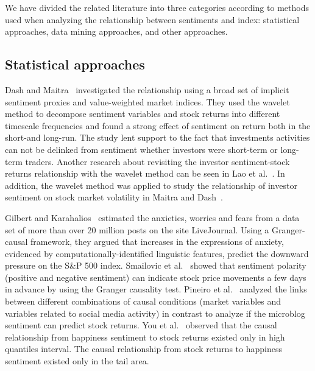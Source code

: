 \documentclass[review,3p,times,12pt,number]{elsarticle}
\begin{document}
We have divided the related literature into three categories according to methods used when analyzing the relationship between sentiments and index: statistical approaches, data mining approaches, and other approaches.
\subsection{Statistical approaches}

Dash and Maitra~\cite{Dash2017Does} investigated the relationship using a broad set of implicit sentiment proxies and value-weighted market indices. They used the wavelet method to decompose sentiment variables and stock returns into different timescale frequencies and found a strong effect of sentiment on return both in the short-and long-run. The study lent support to the fact that investments activities can not be delinked from sentiment whether investors were short-term or long-term traders. Another research about revisiting the investor sentiment-stock returns relationship with the wavelet method can be seen in Lao et al.~\cite{Lao2018Revisiting}.
In addition, the wavelet method was applied to study the relationship of investor sentiment on stock market volatility in Maitra and Dash~\cite{Maitra2017Sentiment}.

Gilbert and Karahalios~\cite{Gilbert2010} estimated the anxieties, worries and fears from a data set of more than over 20 million posts on the site LiveJournal. Using a Granger-causal framework, they argued that increases in the expressions of anxiety, evidenced by computationally-identified linguistic features, predict the downward pressure on the S\&P 500 index.
Smailovic et al.~\cite{Smailovi2013Predictive} showed that sentiment polarity (positive and negative sentiment) can indicate stock price movements a few days in advance by using the Granger causality test.
Pineiro et al.~\cite{Pi2016Examining} analyzed the links between different combinations of causal conditions (market variables and variables related to social media activity) in contrast to analyze if the microblog sentiment can predict stock returns.
You et al.~\cite{You2017Twitter} observed that the causal relationship from happiness sentiment to stock returns existed only in high quantiles interval. The causal relationship from stock returns to happiness sentiment existed only in the tail area.
\end{document}
